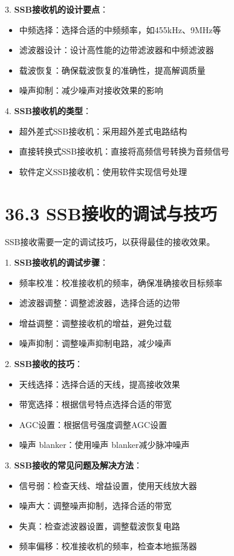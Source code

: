 \documentclass[12pt,UTF8]{ctexbook}
\begin{document}
3. \textbf{SSB接收机的设计要点}：
   \begin{itemize}[leftmargin=3.5em]
   \item 中频选择：选择合适的中频频率，如455kHz、9MHz等
   \item 滤波器设计：设计高性能的边带滤波器和中频滤波器
   \item 载波恢复：确保载波恢复的准确性，提高解调质量
   \item 噪声抑制：减少噪声对接收效果的影响
   \end{itemize}

4. \textbf{SSB接收机的类型}：
   \begin{itemize}[leftmargin=3.5em]
   \item 超外差式SSB接收机：采用超外差式电路结构
   \item 直接转换式SSB接收机：直接将高频信号转换为音频信号
   \item 软件定义SSB接收机：使用软件实现信号处理
   \end{itemize}

\section*{36.3 SSB接收的调试与技巧}

SSB接收需要一定的调试技巧，以获得最佳的接收效果。

1. \textbf{SSB接收机的调试步骤}：
   \begin{itemize}[leftmargin=3.5em]
   \item 频率校准：校准接收机的频率，确保准确接收目标频率
   \item 滤波器调整：调整滤波器，选择合适的边带
   \item 增益调整：调整接收机的增益，避免过载
   \item 噪声抑制：调整噪声抑制电路，减少噪声
   \end{itemize}

2. \textbf{SSB接收的技巧}：
   \begin{itemize}[leftmargin=3.5em]
   \item 天线选择：选择合适的天线，提高接收效果
   \item 带宽选择：根据信号特点选择合适的带宽
   \item AGC设置：根据信号强度调整AGC设置
   \item 噪声 blanker：使用噪声 blanker减少脉冲噪声
   \end{itemize}

3. \textbf{SSB接收的常见问题及解决方法}：
   \begin{itemize}[leftmargin=3.5em]
   \item 信号弱：检查天线、增益设置，使用天线放大器
   \item 噪声大：调整噪声抑制，选择合适的带宽
   \item 失真：检查滤波器设置，调整载波恢复电路
   \item 频率偏移：校准接收机的频率，检查本地振荡器
   \end{itemize}
\end{document}

